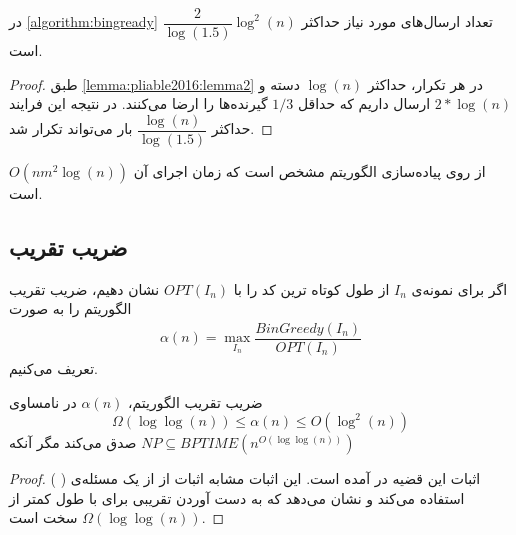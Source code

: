 \begin{theorem}
    \label{theorem:pliable2016:theorem1}
    در
    \autoref{algorithm:bingready}
    تعداد ارسال‌های مورد نیاز حداکثر
    $\dfrac{2}{\log(1.5)} \log^2(n)$
    است.
\end{theorem}
\begin{proof}
    طبق
    \autoref{lemma:pliable2016:lemma2}
    در هر تکرار، حداکثر
    $\log(n)$
    دسته و
    $2 * \log(n)$
    ارسال داریم که حداقل
    $1/3$
    گیرنده‌ها را ارضا می‌کنند. در نتیجه این فرایند حداکثر
    $\dfrac{\log(n)}{\log(1.5)}$
    بار می‌تواند تکرار شد.
\end{proof}

از روی پیاده‌سازی الگوریتم مشخص است که زمان اجرای آن
$O(nm^2 \log(n))$
است.
\subsection{
    ضریب تقریب
}
\begin{definition}
    اگر برای نمونه‌ی
    $I_n$
    از
    \picod
    طول کوتاه ترین کد را با
    $OPT(I_n)$
    نشان دهیم، ضریب تقریب الگوریتم را به صورت
    \begin{align}
        \alpha(n) = \max\limits_{I_n} \dfrac{BinGreedy(I_n)}{OPT(I_n)}
    \end{align}
    تعریف می‌کنیم.
\end{definition}


\begin{theorem}
    \label{theorem:pliable2016:theorem2}
    ضریب تقریب الگوریتم،
    $\alpha(n)$
    در نامساوی
    $$\Omega(\log \log (n)) \leq \alpha(n) \leq O(\log^2(n))$$
    صدق می‌کند مگر آنکه
    $NP \subseteq BPTIME(n^{O(\log \log (n))})$
\end{theorem}
\begin{proof}
    اثبات این قضیه در
    \cite{song2016deterministic}
    آمده است. این اثبات مشابه اثبات
    \cite{ELKIN20048}
    از
    از یک مسئله‌ی
    \nphard
    (
    ) استفاده می‌کند و نشان می‌دهد که به دست آوردن تقریبی برای
    \picod
    با طول کمتر از
    $\Omega(\log \log (n))$
    سخت است.
\end{proof}

